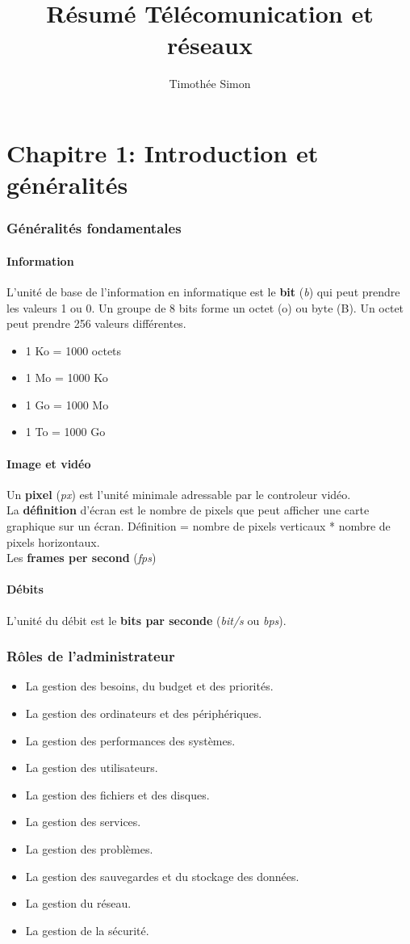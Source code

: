 \documentclass[10pt,a4paper]{article}
\author{Timothée Simon}
\title{Résumé Télécomunication et réseaux}
\begin{document}
 \part{Chapitre 1: Introduction et généralités}
 \section{Généralités fondamentales}

 \subsection{Information}
 L'unité de base de l'information en informatique est le \textbf{bit} (\textit{b}) qui peut prendre les valeurs 1 ou 0. Un groupe de 8 bits forme un octet (o) ou byte (B). Un octet peut prendre 256 valeurs différentes.
 \begin{itemize}
 	\item 1 Ko = 1000 octets
 	\item 1 Mo = 1000 Ko
 	\item 1 Go = 1000 Mo
	\item 1 To = 1000 Go
 \end{itemize}

 \subsection{Image et vidéo}
 Un \textbf{pixel} (\textit{px}) est l'unité minimale adressable par le controleur vidéo.\\
 La \textbf{définition} d'écran est le nombre de pixels que peut afficher une carte graphique sur un écran. Définition = nombre de pixels verticaux * nombre de pixels horizontaux.\\
 Les \textbf{frames per second} (\textit{fps})

 \subsection{Débits}
 L'unité du débit est le \textbf{bits par seconde} (\textit{bit/s} ou \textit{bps}).


 \section{Rôles de l'administrateur}
 \begin{itemize}
	 \item La gestion des besoins, du budget et des priorités.
	 \item La gestion des ordinateurs et des périphériques.
	 \item La gestion des performances des systèmes.
	 \item La gestion des utilisateurs.
	 \item La gestion des fichiers et des disques.
	 \item La gestion des services.
	 \item La gestion des problèmes.
	 \item La gestion des sauvegardes et du stockage des données.
	 \item La gestion du réseau.
	 \item La gestion de la sécurité.
 \end{itemize}
\end{document}
